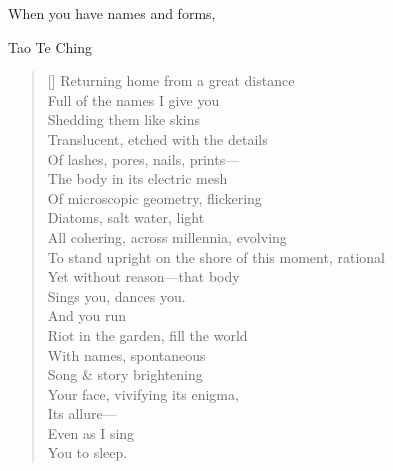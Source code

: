 When you have names and forms,
\label{ch:child}

Tao Te Ching

\settowidth{\versewidth}{To stand upright on the shore of this moment, rational}
\begin{verse}[\versewidth]
Returning home from a great distance\\
Full of the names I give you\\
Shedding them like skins\\
Translucent, etched with the details\\
Of lashes, pores, nails, prints---\\
The body in its electric mesh\\
Of microscopic geometry, flickering\\
Diatoms, salt water, light\\
All cohering, across millennia, evolving\\
To stand upright on the shore of this moment, rational\\
Yet without reason---that body\\
Sings you, dances you.\\
\hfill And you run\\
Riot in the garden, fill the world\\
With names, spontaneous\\
Song \& story brightening \\
Your face, vivifying its enigma,\\
Its allure---\\
\hfill Even as I sing\\
You to sleep.
\end{verse}
